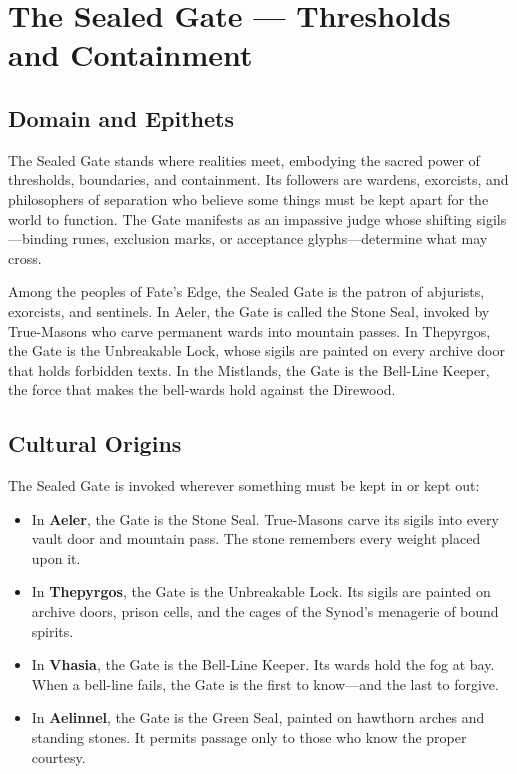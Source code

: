\section{The Sealed Gate — Thresholds and Containment}

\subsection{Domain and Epithets}

The Sealed Gate stands where realities meet, embodying the sacred power of thresholds, boundaries, and containment. Its followers are wardens, exorcists, and philosophers of separation who believe some things must be kept apart for the world to function. The Gate manifests as an impassive judge whose shifting sigils—binding runes, exclusion marks, or acceptance glyphs—determine what may cross.

Among the peoples of Fate's Edge, the Sealed Gate is the patron of abjurists, exorcists, and sentinels. In Aeler, the Gate is called the Stone Seal, invoked by True-Masons who carve permanent wards into mountain passes. In Thepyrgos, the Gate is the Unbreakable Lock, whose sigils are painted on every archive door that holds forbidden texts. In the Mistlands, the Gate is the Bell-Line Keeper, the force that makes the bell-wards hold against the Direwood.

\subsection{Cultural Origins}

The Sealed Gate is invoked wherever something must be kept in or kept out:

\begin{itemize}
\item In \textbf{Aeler}, the Gate is the Stone Seal. True-Masons carve its sigils into every vault door and mountain pass. The stone remembers every weight placed upon it.
\item In \textbf{Thepyrgos}, the Gate is the Unbreakable Lock. Its sigils are painted on archive doors, prison cells, and the cages of the Synod's menagerie of bound spirits.
\item In \textbf{Vhasia}, the Gate is the Bell-Line Keeper. Its wards hold the fog at bay. When a bell-line fails, the Gate is the first to know—and the last to forgive.
\item In \textbf{Aelinnel}, the Gate is the Green Seal, painted on hawthorn arches and standing stones. It permits passage only to those who know the proper courtesy.
\end{itemize}

